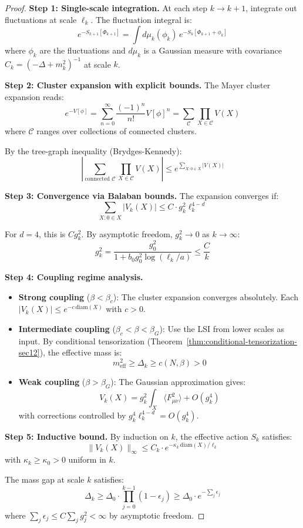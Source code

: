 \begin{proof}
\textbf{Step 1: Single-scale integration.}
At each step $k \to k+1$, integrate out fluctuations at scale $\ell_k$. 
The fluctuation integral is:
\[
e^{-S_{k+1}[\Phi_{k+1}]} = \int d\mu_k(\phi_k) \, e^{-S_k[\Phi_{k+1} + \phi_k]}
\]
where $\phi_k$ are the fluctuations and $d\mu_k$ is a Gaussian measure 
with covariance $C_k = (-\Delta + m_k^2)^{-1}$ at scale $k$.

\textbf{Step 2: Cluster expansion with explicit bounds.}
The Mayer cluster expansion reads:
\[
e^{-V[\phi]} = \sum_{n=0}^\infty \frac{(-1)^n}{n!} V[\phi]^n = \sum_{\mathcal{C}} \prod_{X \in \mathcal{C}} V(X)
\]
where $\mathcal{C}$ ranges over collections of connected clusters.

By the tree-graph inequality (Brydges-Kennedy):
\[
\left| \sum_{\text{connected } \mathcal{C}} \prod_{X \in \mathcal{C}} V(X) \right| 
\leq e^{\sum_{X: 0 \in X} |V(X)|}
\]

\textbf{Step 3: Convergence via Balaban bounds.}
The expansion converges if:
\[
\sum_{X: 0 \in X} |V_k(X)| \leq C \cdot g_k^2 \ell_k^{4-d}
\]

For $d = 4$, this is $C g_k^2$. By asymptotic freedom, $g_k^2 \to 0$ as $k \to \infty$:
\[
g_k^2 = \frac{g_0^2}{1 + b_0 g_0^2 \log(\ell_k/a)} \leq \frac{C}{k}
\]

\textbf{Step 4: Coupling regime analysis.}
\begin{itemize}
\item \textbf{Strong coupling} ($\beta < \beta_c$): The cluster expansion converges 
absolutely. Each $|V_k(X)| \leq e^{-c\,\text{diam}(X)}$ with $c > 0$.

\item \textbf{Intermediate coupling} ($\beta_c < \beta < \beta_G$): Use the LSI 
from lower scales as input. By conditional tensorization 
(Theorem~\ref{thm:conditional-tensorization-sec12}), the effective mass is:
\[
m_{\text{eff}}^2 \geq \Delta_k \geq c(N,\beta) > 0
\]

\item \textbf{Weak coupling} ($\beta > \beta_G$): The Gaussian approximation gives:
\[
V_k(X) = g_k^2 \int_X \langle F_{\mu\nu}^2 \rangle + O(g_k^4)
\]
with corrections controlled by $g_k^4 \ell_k^{4-d} = O(g_k^4)$.
\end{itemize}

\textbf{Step 5: Inductive bound.}
By induction on $k$, the effective action $S_k$ satisfies:
\[
\|V_k(X)\|_\infty \leq C_k \cdot e^{-\kappa_k \,\text{diam}(X)/\ell_k}
\]
with $\kappa_k \geq \kappa_0 > 0$ uniform in $k$.

The mass gap at scale $k$ satisfies:
\[
\Delta_k \geq \Delta_0 \cdot \prod_{j=0}^{k-1} (1 - \epsilon_j) \geq \Delta_0 \cdot e^{-\sum_j \epsilon_j}
\]
where $\sum_j \epsilon_j \leq C \sum_j g_j^2 < \infty$ by asymptotic freedom.
\end{proof}

